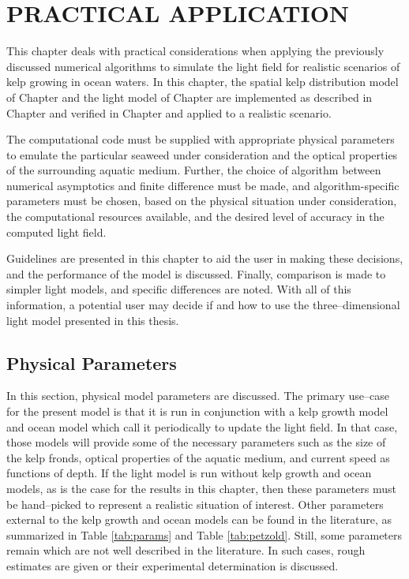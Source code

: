 \chapter{PRACTICAL APPLICATION}
\label{chap:application}

This chapter deals with practical considerations when applying the previously discussed numerical algorithms to simulate the light field for realistic scenarios of kelp growing in ocean waters.
In this chapter, the spatial kelp distribution model of Chapter \Rom{\ref{chap:kelp}} and the light model of Chapter \Rom{\ref{chap:light}} are implemented as described in Chapter \Rom{\ref{chap:numerical}} and verified in Chapter \Rom{\ref{chap:model_analysis}} and applied to a realistic scenario.

The computational code must be supplied with appropriate physical parameters to emulate the particular seaweed under consideration and the optical properties of the surrounding aquatic medium.
Further, the choice of algorithm between numerical asymptotics and finite difference must be made, and algorithm-specific parameters must be chosen, based on the physical situation under consideration, the computational resources available, and the desired level of accuracy in the computed light field.

Guidelines are presented in this chapter to aid the user in making these decisions, and the performance of the model is discussed.
Finally, comparison is made to simpler light models, and specific differences are noted.
With all of this information, a potential user may decide if and how to use the three--dimensional light model presented in this thesis.

\section{Physical Parameters}
\label{sec:parameters}
In this section, physical model parameters are discussed.
The primary use--case for the present model is that it is run in conjunction with a kelp growth model and ocean model
which call it periodically to update the light field.
In that case, those models will provide some of the necessary parameters such as the size of the kelp fronds, optical properties of the aquatic medium, and current speed as functions of depth.
If the light model is run without kelp growth and ocean models, as is the case for the results in this chapter, then these parameters must be hand--picked to represent a realistic situation of interest.
Other parameters external to the kelp growth and ocean models can be found in the literature,
as summarized in Table \ref{tab:params} and Table \ref{tab:petzold}.
Still, some parameters remain which are not well described in the literature.
In such cases, rough estimates are given or their experimental determination is discussed.

